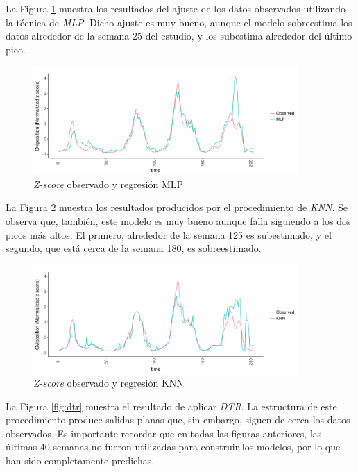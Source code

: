    \par La Figura \ref{fig:mlp} muestra los resultados del ajuste de
    los datos observados utilizando la técnica de \textit{MLP}. Dicho ajuste es muy
    bueno, aunque el modelo sobreestima los datos alrededor de la semana 25
    del estudio, y los subestima alrededor del último pico.
      \begin{figure}[hbt]
      \centering%
      \includegraphics[width=0.9\textwidth]{images/mlp}%
      \caption{\textit{Z-score} observado y regresión MLP}\label{fig:mlp}
      \end{figure}


  \par La Figura \ref{fig:knn} muestra los resultados producidos por el procedimiento
    de \textit{KNN}. Se observa que, también, este modelo es muy bueno aunque
    falla siguiendo a los dos picos más altos. El primero, alrededor de la semana
    125 es subestimado, y el segundo, que está cerca de la semana 180, es
    sobreestimado.

    \begin{figure}[hbt]
    \centering%
    \includegraphics[width=0.9\textwidth]{images/knn}%
    \caption{\textit{Z-score} observado y regresión KNN}\label{fig:knn}
    \end{figure}


  \par La Figura \ref{fig:dtr} muestra el resultado de aplicar \textit{DTR}.
    La estructura de este procedimiento produce salidas
    planas que, sin embargo, siguen de cerca los datos observados.
    Es importante recordar que en todas las figuras anteriores, las últimas
    40 semanas no fueron utilizadas para construir los modelos, por lo que
    han sido completamente predichas.

